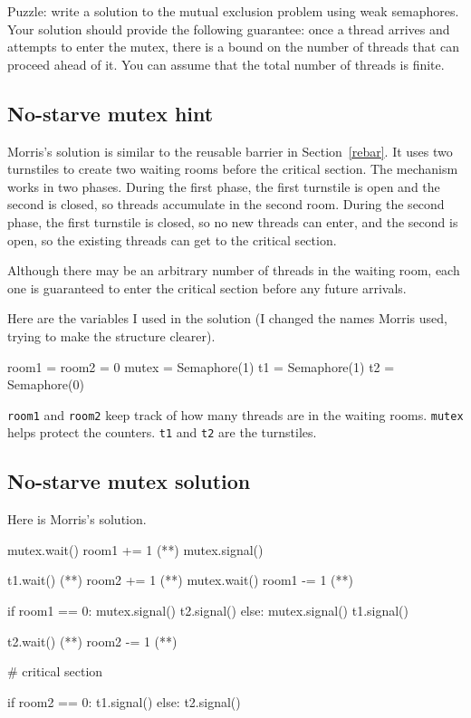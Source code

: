 \documentclass{book}
\begin{document}
Puzzle: write a solution to the mutual exclusion problem using weak
semaphores.  Your solution should provide the following guarantee:
once a thread arrives and attempts to enter the mutex, there is a
bound on the number of threads that can proceed ahead of it.  You can
assume that the total number of threads is finite.



\subsection{No-starve mutex hint}
\label{morris}

Morris's solution is similar to the reusable barrier in
Section~\ref{rebar}.  It uses two turnstiles to create two waiting
rooms before the critical section.  The mechanism works in two phases.
During the first phase, the first turnstile is open and the second is
closed, so threads accumulate in the second room.  During the second
phase, the first turnstile is closed, so no new threads can enter, and
the second is open, so the existing threads can get to the critical
section.

Although there may be an arbitrary number of threads in the waiting
room, each one is guaranteed to enter the critical section before any
future arrivals.

Here are the variables I used in the solution (I changed the
names Morris used, trying to make the structure clearer).

\begin{unbreakable}[title={No-starve mutex hint}]{}
room1 = room2 = 0
mutex = Semaphore(1)
t1 = Semaphore(1)
t2 = Semaphore(0)
\end{unbreakable}

{\tt room1} and {\tt room2} keep track of how many threads are in the
waiting rooms.  {\tt mutex} helps protect the counters.  {\tt t1} and
    {\tt t2} are the turnstiles.



\subsection{No-starve mutex solution}

Here is Morris's solution.

\begin{unbreakable}[title={Morris's algorithm}]{}
mutex.wait()
    room1 += 1            (*\label{room1begin}*)
mutex.signal()
                           
t1.wait()                 (*\label{wait1}*)
    room2 += 1            (*\label{room2begin}*)
    mutex.wait()
    room1 -= 1            (*\label{room1end}*)

    if room1 == 0: 
        mutex.signal()
	t2.signal()
    else: 
        mutex.signal()
	t1.signal()

t2.wait()                  (*\label{wait2}*)
    room2 -= 1             (*\label{room2end}*)

    # critical section

    if room2 == 0:
        t1.signal()
    else:
        t2.signal()
\end{unbreakable}
\end{document}
